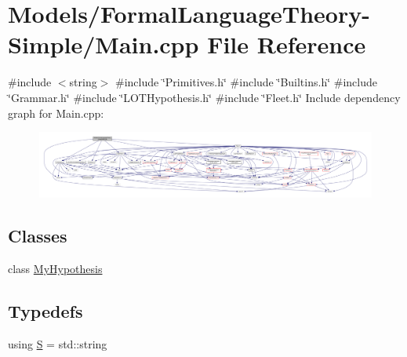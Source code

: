\hypertarget{_models_2_formal_language_theory-_simple_2main_8cpp}{}\section{Models/\+Formal\+Language\+Theory-\/\+Simple/\+Main.cpp File Reference}
\label{_models_2_formal_language_theory-_simple_2main_8cpp}
{\ttfamily \#include $<$string$>$}\newline
{\ttfamily \#include \char`\"{}Primitives.\+h\char`\"{}}\newline
{\ttfamily \#include \char`\"{}Builtins.\+h\char`\"{}}\newline
{\ttfamily \#include \char`\"{}Grammar.\+h\char`\"{}}\newline
{\ttfamily \#include \char`\"{}L\+O\+T\+Hypothesis.\+h\char`\"{}}\newline
{\ttfamily \#include \char`\"{}Fleet.\+h\char`\"{}}\newline
Include dependency graph for Main.\+cpp\+:
\nopagebreak
\begin{figure}[H]
\begin{center}
\leavevmode
\includegraphics[width=350pt]{_models_2_formal_language_theory-_simple_2main_8cpp__incl}
\end{center}
\end{figure}
\subsection*{Classes}
\begin{DoxyCompactItemize}
\item 
class \hyperlink{class_my_hypothesis}{My\+Hypothesis}
\end{DoxyCompactItemize}
\subsection*{Typedefs}
\begin{DoxyCompactItemize}
\item 
using \hyperlink{_models_2_formal_language_theory-_simple_2main_8cpp_a51c40915539205f0b5add30b0d68a4cb}{S} = std\+::string
\end{DoxyCompactItemize}
